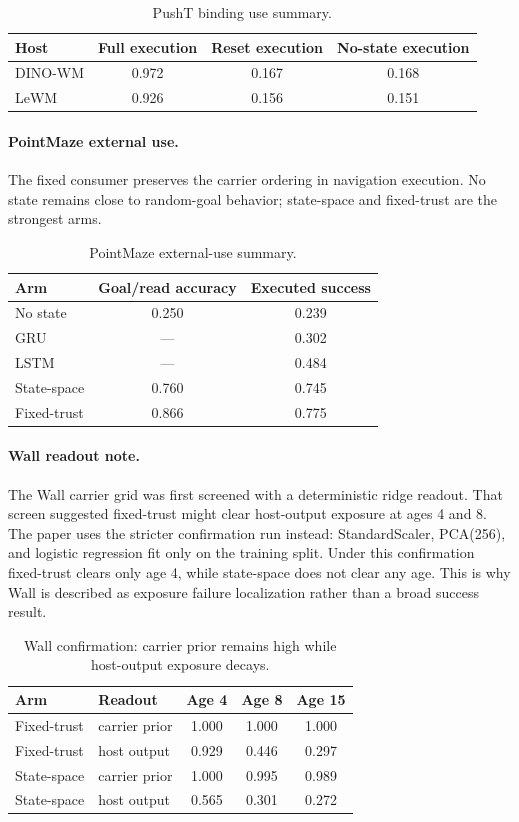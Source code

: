 \begin{table}[H]
\centering
\footnotesize
\caption{PushT binding use summary.}
\begin{tabular}{lccc}
\toprule
Host & Full execution & Reset execution & No-state execution\\
\midrule
DINO-WM & 0.972 & 0.167 & 0.168\\
LeWM    & 0.926 & 0.156 & 0.151\\
\bottomrule
\end{tabular}
\end{table}

\paragraph{PointMaze external use.}
The fixed consumer preserves the carrier ordering in navigation execution.  No
state remains close to random-goal behavior; state-space and fixed-trust are
the strongest arms.

\begin{table}[H]
\centering
\footnotesize
\caption{PointMaze external-use summary.}
\begin{tabular}{lcc}
\toprule
Arm & Goal/read accuracy & Executed success\\
\midrule
No state & 0.250 & 0.239\\
GRU & --- & 0.302\\
LSTM & --- & 0.484\\
State-space & 0.760 & 0.745\\
Fixed-trust & 0.866 & 0.775\\
\bottomrule
\end{tabular}
\end{table}

\paragraph{Wall readout note.}
The Wall carrier grid was first screened with a deterministic ridge readout.
That screen suggested fixed-trust might clear host-output exposure at ages 4
and 8.  The paper uses the stricter confirmation run instead:
StandardScaler, PCA(256), and logistic regression fit only on the training
split.  Under this confirmation fixed-trust clears only age 4, while
state-space does not clear any age.  This is why Wall is described as exposure
failure localization rather than a broad success result.

\begin{table}[H]
\centering
\footnotesize
\caption{Wall confirmation: carrier prior remains high while host-output
exposure decays.}
\begin{tabular}{llccc}
\toprule
Arm & Readout & Age 4 & Age 8 & Age 15\\
\midrule
Fixed-trust & carrier prior & 1.000 & 1.000 & 1.000\\
Fixed-trust & host output & 0.929 & 0.446 & 0.297\\
State-space & carrier prior & 1.000 & 0.995 & 0.989\\
State-space & host output & 0.565 & 0.301 & 0.272\\
\bottomrule
\end{tabular}
\end{table}

